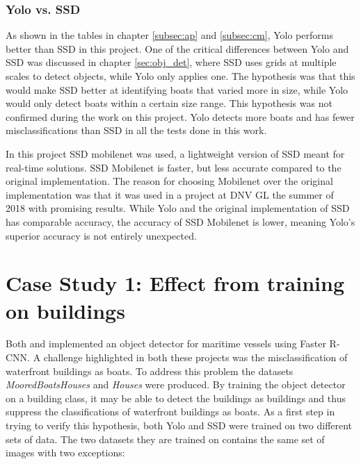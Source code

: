 \subsubsection{Yolo vs. SSD}
As shown in the tables in chapter \ref{subsec:ap} and \ref{subsec:cm}, Yolo performs better than SSD in this project. One of the critical differences between Yolo and SSD was discussed in chapter \ref{sec:obj_det}, where SSD uses grids at multiple scales to detect objects, while Yolo only applies one. The hypothesis was that this would make SSD better at identifying boats that varied more in size, while Yolo would only detect boats within a certain size range. This hypothesis was not confirmed during the work on this project. Yolo detects more boats and has fewer misclassifications than SSD in all the tests done in this work.

\vspace{3mm}

In this project SSD mobilenet was used, a lightweight version of SSD meant for real-time solutions. SSD Mobilenet is faster, but less accurate compared to the original implementation. The reason for choosing Mobilenet over the original implementation was that it was used in a project at DNV GL the summer of 2018 with promising results. While Yolo and the original implementation of SSD has comparable accuracy, the accuracy of SSD Mobilenet is lower, meaning Yolo's superior accuracy is not entirely unexpected. 








\newpage

\section{Case Study 1: Effect from training on buildings}
\label{case_study:eff_build}

Both \citep{Tangstad2017} and \citep{Kamsvag2018} implemented an object detector for maritime vessels using Faster R-CNN. A challenge highlighted in both these projects was the misclassification of waterfront buildings as boats. To address this problem the datasets \textit{MooredBoatsHouses} and \textit{Houses} were produced. By training the object detector on a building class, it may be able to detect the buildings as buildings and thus suppress the classifications of waterfront buildings as boats. As a first step in trying to verify this hypothesis, both Yolo and SSD were trained on two different sets of data. The two datasets they are trained on contains the same set of images with two exceptions:

